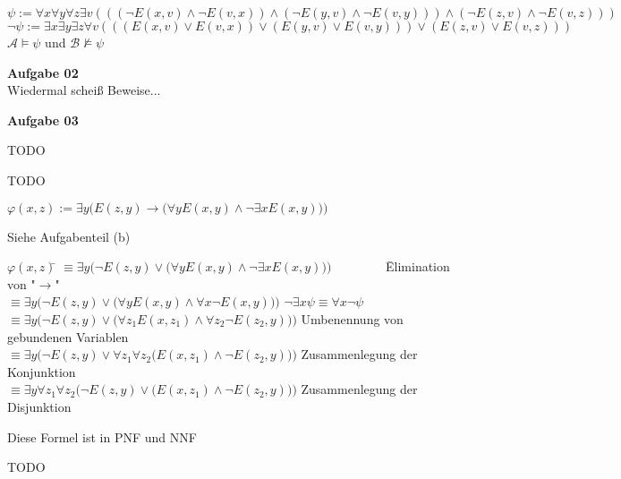 \documentclass[a4paper,10pt]{article}
\begin{document}
\begin{compactenum} [(a)]
		
		\item $ \psi := \forall x \forall y \forall z \exists v (((\lnot E(x,v)\wedge \lnot E(v,x))\wedge  (\lnot E(y,v)\wedge \lnot E(v,y)))\wedge (\lnot E(z,v)\wedge \lnot E(v,z))) $\\
		$ \lnot \psi := \exists x \exists y \exists z \forall v (((E(x,v)\vee E(v,x))\vee  (E(y,v)\vee E(v,y)))\vee (E(z,v)\vee E(v,z))) $ \\
		$ \mathcal{A} \models \psi $ und $ \mathcal{B} \not\models \psi$
	\end{compactenum}
	\newpage
	
	\textbf{Aufgabe 02}\\
	Wiedermal scheiß Beweise...
	
	\newpage
	\textbf{Aufgabe 03}\\
	\begin{compactenum} [(a)]
		\item \begin{compactenum} [(i)]
			\item TODO
			\item TODO
		\end{compactenum}
		\item $ \varphi(x,z) := \exists y \Big(E(z,y)\rightarrow \big(\forall y E(x,y) \wedge \lnot \exists x E(x,y)\big)\Big) $ \\
		\begin{compactenum} [(i)]
			\item Siehe Aufgabenteil (b)
			\\
			\item \begin{tabbing}
				$ \varphi(x,z) $\= $ \equiv \exists y \Big(\lnot E(z,y)\vee \big(\forall y E(x,y) \wedge \lnot \exists x E(x,y)\big)\Big) \qquad \qquad$ \= Elimination von "$ \rightarrow $"\\
				\> $ \equiv \exists y \Big(\lnot E(z,y)\vee \big(\forall y E(x,y) \wedge \forall x \lnot E(x,y)\big)\Big)$ \> $ \lnot \exists x \psi \equiv \forall x \lnot \psi $\\
				\> $ \equiv \exists y \Big(\lnot E(z,y)\vee \big(\forall z_1 E(x,z_1) \wedge \forall z_2 \lnot E(z_2,y)\big)\Big)$ \> Umbenennung von gebundenen Variablen\\
				\> $ \equiv \exists y \Big(\lnot E(z,y)\vee \forall z_1 \forall z_2 \big( E(x,z_1) \wedge \lnot E(z_2,y)\big)\Big)$ \> Zusammenlegung der Konjunktion\\
				\> $ \equiv \exists y \forall z_1 \forall z_2 \Big(\lnot E(z,y)\vee \big( E(x,z_1) \wedge \lnot E(z_2,y)\big)\Big)$ \> Zusammenlegung der Disjunktion\\
			\end{tabbing}
			Diese Formel ist in PNF und NNF
		\end{compactenum}
		\item TODO
	\end{compactenum}
\end{document}
